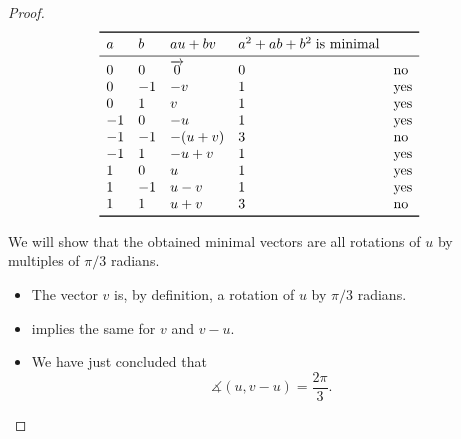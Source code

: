 \begin{proof}
  \begin{table}[!ht]
    \begin{equation*}
      \begin{array}{*{5}{l}}
        \toprule
        a  & b  & au + bv  & a^2 + ab + b^2 \T{is minimal} \\
        \midrule
        0  & 0  & \vect 0  & 0            & \T{no}  \\
        0  & -1 & -v       & 1            & \T{yes} \\
        0  & 1  & v        & 1            & \T{yes} \\
        -1 & 0  & -u       & 1            & \T{yes} \\
        -1 & -1 & -(u + v) & 3            & \T{no}  \\
        -1 & 1  & -u + v   & 1            & \T{yes} \\
        1  & 0  & u        & 1            & \T{yes} \\
        1  & -1 & u - v    & 1            & \T{yes} \\
        1  & 1  & u + v    & 3            & \T{no}  \\
        \bottomrule
      \end{array}
    \end{equation*}
    \caption{All linear combinations of \( u \) and \( v \) satisfying \eqref{eq:thm:hexagonal_point_lattice_minimal_vectors/proof/eq_square} in our proof of \cref{thm:hexagonal_point_lattice_minimal_vectors}}\label{tab:thm:hexagonal_point_lattice_minimal_vectors/proof/eq_square}
  \end{table}

   We will show that the obtained minimal vectors are all rotations of \( u \) by multiples of \( \pi / 3 \) radians.

  \begin{itemize}
    \item The vector \( v \) is, by definition, a rotation of \( u \) by \( \pi / 3 \) radians.

    \item {} implies the same for \( v \) and \( v - u \).

    \item We have just concluded that
    \begin{equation*}
      \measuredangle(u, v - u) = \frac {2\pi} 3.
    \end{equation*}


\end{itemize}
\end{proof}
